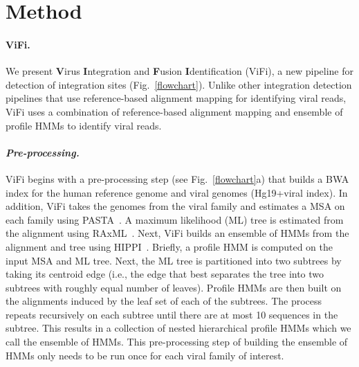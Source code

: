 \documentclass[11pt]{article}
\begin{document}
 
\section*{Method}
\paragraph{\textbf{ViFi.}}
We present \textbf{V}irus \textbf{I}ntegration and \textbf{F}usion \textbf{I}dentification (ViFi), a new pipeline for detection of integration sites (Fig.~\ref{flowchart}).  Unlike other integration detection pipelines that use reference-based alignment mapping for identifying viral reads, ViFi uses a combination of reference-based alignment mapping and ensemble of profile HMMs to identify viral reads.  

\paragraph{\emph{Pre-processing.}} ViFi begins with a pre-processing step (see Fig.~\ref{flowchart}a) that builds a BWA index for the human reference genome and viral genomes (Hg19+viral index).  In addition, ViFi takes the genomes from the viral family and estimates a MSA on each family using PASTA~\cite{Mirarab2014}.  A maximum likelihood (ML) tree is estimated from the alignment using RAxML~\cite{Stamatakis2014}.  Next, ViFi builds an ensemble of HMMs from the alignment and tree using HIPPI~\cite{Nguyen2016_hippi}.  Briefly, a profile HMM is computed on the input MSA and ML tree.  Next, the ML tree is partitioned into two subtrees by taking its centroid edge (i.e., the edge that best separates the tree into two subtrees with roughly equal number of leaves).  Profile HMMs are then built on the alignments induced by the leaf set of each of the subtrees.  The process repeats recursively on each subtree until there are at most 10 sequences in the subtree.  This results in a collection of nested hierarchical profile HMMs which we call the ensemble of HMMs.  This pre-processing step of building the ensemble of HMMs only needs to be run once for each viral family of interest.
\end{document}
